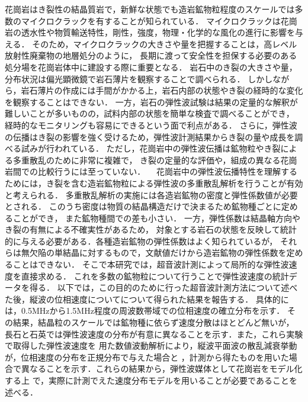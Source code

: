 花崗岩はき裂性の結晶質岩で，新鮮な状態でも造岩鉱物粒程度のスケールでは多数のマイクロクラックを有することが知られている\cite{Kudo1-Takagi}．
マイクロクラックは花崗岩の透水性や物質輸送特性，剛性，強度，物理・化学的な風化の進行に影響を与える．
そのため，マイクロクラックの大きさや量を把握することは，高レベル放射性廃棄物の地層処分のように，
長期に渡って安全性を担保する必要のある処分場を花崗岩体中に建設する際に重要となる．
岩石中のき裂の大きさや量，分布状況は偏光顕微鏡で岩石薄片を観察することで調べられる．
しかしながら，岩石薄片の作成には手間がかかる上，岩石内部の状態やき裂の経時的な変化を観察することはできない．
一方，岩石の弾性波試験は結果の定量的な解釈が難しいことが多いものの，試料内部の状態を簡単な検査で調べることができ，
経時的なモニタリングも容易にできるという面で利点がある．
さらに，弾性波の伝播はき裂の影響を強く受けるため，弾性波計測結果からき裂の量や成長を調べる試みが行われている\cite{Griffiths}．
ただし，花崗岩中の弾性波伝播は鉱物粒やき裂による多重散乱のために非常に複雑で，
き裂の定量的な評価や，組成の異なる花崗岩間での比較行うには至っていない． 
　花崗岩中の弾性波伝播特性を理解するためには，き裂を含む造岩鉱物粒による弾性波の多重散乱解析を行うことが有効と考えられる．
多重散乱解析の実施には各造岩鉱物の密度と弾性係数値が必要とされる．
このうち密度は物質の結晶構造だけで決まるため鉱物種ごとに定めることができ，
また鉱物種間での差も小さい．
一方，弾性係数は結晶軸方向やき裂の有無による不確実性があるため，
対象とする岩石の状態を反映して統計的に与える必要がある．各種造岩鉱物の弾性係数はよく知られているが，
それらは無欠陥の単結晶に対するもので，文献値だけから造岩鉱物の弾性係数を定めることはできない．
そこで本研究では，超音波計測によって局所的な弾性波速度を直接求める．
これを多数の鉱物粒について行うことで弾性波速度の統計データを得る．
以下では，この目的のために行った超音波計測方法について述べた後，縦波の位相速度についてについて得られた結果を報告する．
具体的には，0.5MHzから1.5MHz程度の周波数帯域での位相速度の確立分布を示す．
その結果，結晶粒のスケールでは鉱物種に依らず速度分散はほとどんど無いが，
長石と石英では弾性波速度の分布が有意に異なることを示す．また，これら実験で取得した弾性波速度を
用た数値波動解析により，縦波平面波の散乱減衰挙動が，位相速度の分布を正規分布で与えた場合と
，計測から得たものを用いた場合で異なることを示す．これらの結果から，弾性波媒体として花崗岩をモデル化する上
で，実際に計測でえた速度分布モデルを用いることが必要であることを述べる．

